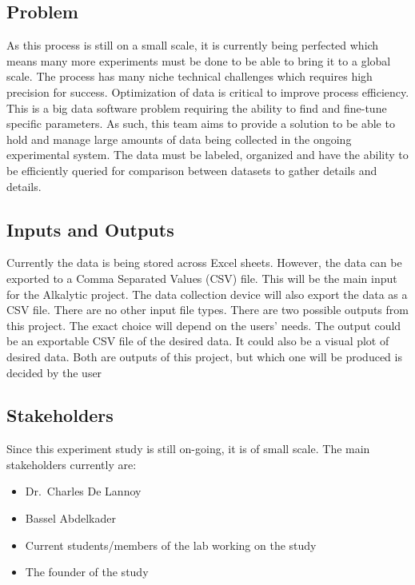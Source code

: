 \documentclass{article}
\begin{document}
\subsection{Problem}
As this process is still on a small scale, it is currently being perfected which
means many more experiments must be done to be able to bring it to a global
scale. The process has many niche technical challenges which requires high
precision for success. Optimization of data is critical to improve process
efficiency. This is a big data software problem requiring the ability to find
and fine-tune specific parameters.
\newline
\newline
As such, this team aims to provide a solution to be able to hold and manage
large amounts of data being collected in the ongoing experimental system. The
data must be labeled, organized and have the ability to be efficiently queried
for comparison between datasets to gather details and details.

\subsection{Inputs and Outputs}
Currently the data is being stored across Excel sheets. However, the data can be
exported to a Comma Separated Values (CSV) file. This will be the main input for the Alkalytic project.
The data collection device will also export the data as a CSV file. There are no
other input file types.
\newline
\newline
There are two possible outputs from this project. The exact choice will depend
on the users' needs. The output could be an exportable CSV file of the desired
data. It could also be a visual plot of desired data. Both are outputs of this
project, but which one will be produced is decided by the user


\subsection{Stakeholders}
Since this experiment study is still on-going, it is of small scale. \newline
The main stakeholders currently are:
\begin{itemize}
    \item Dr.\ Charles De Lannoy
    \item Bassel Abdelkader
    \item Current students/members of the lab working on the study
    \item The founder of the study
\end{itemize}
\end{document}
